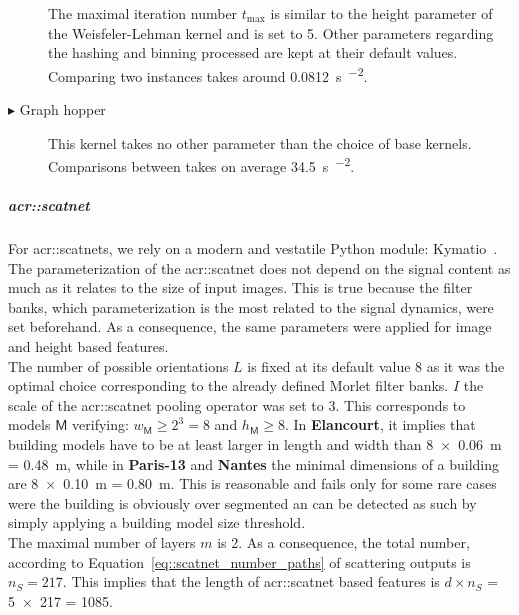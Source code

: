 \begin{description}
                                    The maximal iteration number \(t_{\max}\) is similar to the height parameter of the Weisfeler-Lehman kernel and is set to 5.
                                    Other parameters regarding the hashing and binning processed are kept at their default values.
                                    Comparing two instances takes around \SI{0.0812}{\s\per\building\squared}.
                        \item[\(\blacktriangleright\) Graph hopper] This kernel takes no other parameter than the choice of base kernels.
                                    Comparisons between takes on average \SI{34.5}{\s\per\building\squared}.
                    \end{description}

                \subparagraph{\gls*{acr::scatnet}}
                    For \glspl{acr::scatnet}, we rely on a modern and vestatile Python module: Kymatio~\parencite{andreux2018kymatio}.
                    The parameterization of the \gls{acr::scatnet} does not depend on the signal content as much as it relates to the size of input images.
                    This is true because the filter banks, which parameterization is the most related to the signal dynamics, were set beforehand.
                    As a consequence, the same parameters were applied for image and height based features.\\

                    The number of possible orientations \(L\) is fixed at its default value 8 as it was the optimal choice corresponding to the already defined Morlet filter banks.
                    \(I\) the scale of the \gls{acr::scatnet} pooling operator was set to 3.
                    This corresponds to models \(\mathsf{M}\) verifying: \(w_{\mathsf{M}} \geq 2^3 = 8\) and \(h_{\mathsf{M}} \geq 8\).
                    In \textbf{Elancourt}, it implies that building models have to be at least larger in length and width than \SI{8 x 0.06}{\m} = \SI{0.48}{\m}, while in \textbf{Paris-13} and \textbf{Nantes} the minimal dimensions of a building are \SI{8 x 0.10}{\m} = \SI{0.80}{\m}.
                    This is reasonable and fails only for some rare cases were the building is obviously over segmented an can be detected as such by simply applying a building model size threshold.\\
                    The maximal number of layers \(m\) is 2.
                    As a consequence, the total number, according to Equation~\ref{eq::scatnet_number_paths} of scattering outputs is \(n_S = 217\).
                    This implies that the length of \gls{acr::scatnet} based features is \(d \times n_S\) = \num{5 x 217} = 1085.\\

